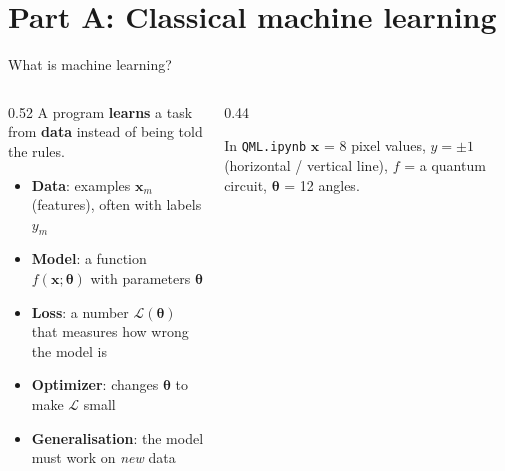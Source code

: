 \documentclass[aspectratio=169,11pt]{beamer}
\newcommand{\key}[1]{{\color{qdark}\textbf{#1}}}
\newcommand{\btheta}{\boldsymbol\theta}
\newcommand{\bx}{\mathbf x}
\begin{document}
\section{Part A: Classical machine learning}
\begin{frame}[label=fML]{What is machine learning?}
  \begin{columns}[T]
    \begin{column}{0.52\textwidth}
      \small
      A program \key{learns} a task from \key{data} instead of being told the rules.
      \begin{itemize}\itemsep1pt
        \item \key{Data}: examples $\bx_m$ (features), often with labels $y_m$
        \item \key{Model}: a function $f(\bx; \btheta)$ with parameters $\btheta$
        \item \key{Loss}: a number $\mathcal L(\btheta)$ that measures how wrong the model is
        \item \key{Optimizer}: changes $\btheta$ to make $\mathcal L$ small
        \item \key{Generalisation}: the model must work on \emph{new} data
      \end{itemize}
    \end{column}
    \begin{column}{0.44\textwidth}
      \centering
      \begin{exampleblock}{In \texttt{QML.ipynb}}
        \scriptsize $\bx$ = 8 pixel values, $y = \pm1$ (horizontal / vertical line), $f$ = a quantum circuit, $\btheta$ = 12 angles.
      \end{exampleblock}
    \end{column}
  \end{columns}
\end{frame}
\end{document}
